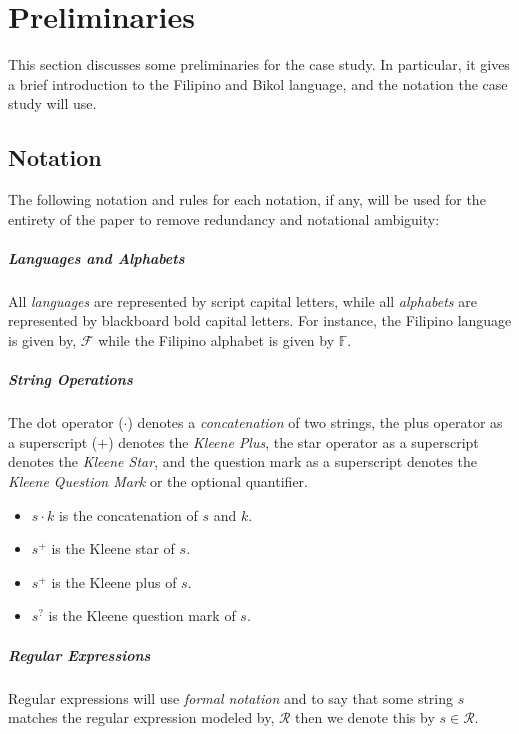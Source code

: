 \chapter{Preliminaries}
This section discusses some preliminaries for the case study. In particular, it gives a brief introduction to the Filipino and Bikol language, and the notation the case study will use.

\section{Notation}
The following notation and rules for each notation, if any, will be used for the entirety of the paper to remove redundancy and notational ambiguity:

\paragraph{Languages and Alphabets}
All \emph{languages} are represented by script capital letters, while all \emph{alphabets} are represented by blackboard bold capital letters. For instance, the Filipino language is given by, \(\mathcal{F}\) while the Filipino alphabet is given by \(\mathbb{F}\).

\paragraph{String Operations}
The dot operator (\(\cdot\)) denotes a \emph{concatenation} of two strings, the plus operator as a superscript (\(+\)) denotes the \emph{Kleene Plus}, the star operator as a superscript denotes the \emph{Kleene Star}, and the question mark as a superscript denotes the \emph{Kleene Question Mark} or the optional quantifier.

\begin{itemize}
    \item $s\cdot k$ is the concatenation of $s$ and $k$.
    \item $s^+$ is the Kleene star of $s$.
    \item $s^+$ is the Kleene plus of $s$.
    \item $s^?$ is the Kleene question mark of $s$.
\end{itemize}

\paragraph{Regular Expressions}
Regular expressions will use \emph{formal notation} and to say that some string \(s\) matches the regular expression modeled by, \(\mathcal{R}\) then we denote this by \(s \in \mathcal{R}\).

